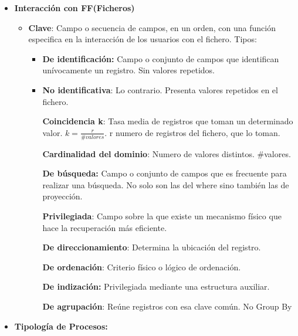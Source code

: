 \documentclass[12pt, twoside, openright]{report} %
\begin{document}
\begin{itemize}
\begin{itemize}
\begin{itemize}
        \end{itemize}
      \item \textbf{Interacción con FF(Ficheros)}
        

        \begin{itemize}
        \item \textbf{Clave}: Campo o secuencia de campos, en un orden, con
          una función especifica en la interacción de los usuarios con
          el fichero. Tipos:
          

          \begin{itemize}
          \item
            
            \textbf{De identificación:} Campo o conjunto de campos que
            identifican unívocamente un registro. Sin valores repetidos.
            
          \item
            
            \textbf{No identificativa}: Lo contrario. Presenta valores
            repetidos en el fichero.
            

            
			
              \textbf{Coincidencia k}: Tasa media de registros que toman
              un determinado valor. $k=\frac{r}{\#valores}$. r numero de
              registros del fichero, que lo toman.
              
			  
              \textbf{Cardinalidad del dominio}: Numero de valores
              distintos. \#valores.
            
			  
            \textbf{De búsqueda:} Campo o conjunto de campos que es
            frecuente para realizar una búsqueda. No solo son las del
            where sino también las de proyección.
            
			
            \textbf{Privilegiada}: Campo sobre la que existe un
            mecanismo físico que hace la recuperación más eficiente.

           
              \textbf{De direccionamiento}: Determina la ubicación del
              registro.
             
              \textbf{De ordenación}: Criterio físico o lógico de
              ordenación.
              
              \textbf{De indización:} Privilegiada mediante una
              estructura auxiliar.
             
              \textbf{De agrupación}: Reúne registros con esa clave
              común. No Group By
          \end{itemize}
        \end{itemize}
      \item \textbf{Tipología de Procesos:}
        


\end{itemize}
\end{itemize}
\end{document}
